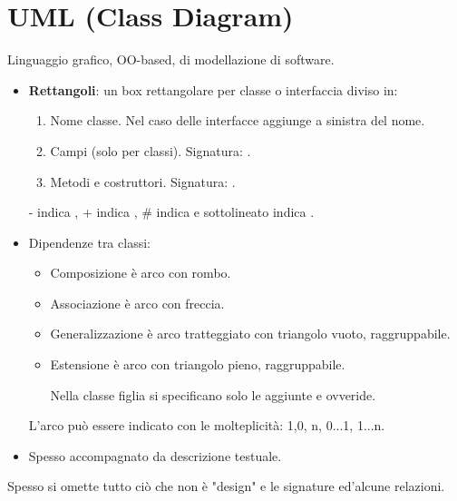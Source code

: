\section{UML (Class Diagram)}
Linguaggio grafico, OO-based, di modellazione di software.
\begin{itemize}
	\item \textbf{Rettangoli}: un box rettangolare per classe o interfaccia diviso in:
	\begin{enumerate}
		\item Nome classe. Nel caso delle interfacce aggiunge  a sinistra del nome.
		\item Campi (solo per classi). Signatura: .
		\item Metodi e costruttori. Signatura: .
	\end{enumerate}
	- indica , + indica , \# indica  e sottolineato indica .
	\item Dipendenze tra classi:
	\begin{itemize}
		\item Composizione è arco con rombo.
		\item Associazione è arco con freccia.
		\item Generalizzazione è arco tratteggiato con triangolo vuoto, raggruppabile.
		\item Estensione è arco con triangolo pieno, raggruppabile.

		Nella classe figlia si specificano solo le aggiunte e ovveride.
	\end{itemize}
	L'arco può essere indicato con le molteplicità: 1,0, n, 0...1, 1...n.

	\item Spesso accompagnato da descrizione testuale.
\end{itemize}

Spesso si omette tutto ciò che non è "design" e le signature ed'alcune relazioni.
